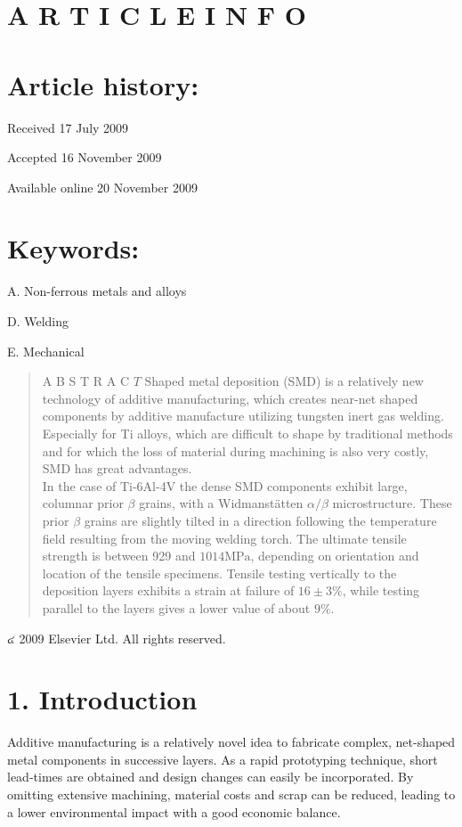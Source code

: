 \documentclass[10pt]{article}
\begin{document}
\section*{A R T I C L E I N F O}
\section*{Article history:}
Received 17 July 2009

Accepted 16 November 2009

Available online 20 November 2009

\section*{Keywords:}
A. Non-ferrous metals and alloys

D. Welding

E. Mechanical

\begin{abstract}
A B S T R A C $T$ Shaped metal deposition (SMD) is a relatively new technology of additive manufacturing, which creates near-net shaped components by additive manufacture utilizing tungsten inert gas welding.\\
Especially for Ti alloys, which are difficult to shape by traditional methods and for which the loss of material during machining is also very costly, SMD has great advantages.\\
In the case of Ti-6Al-4V the dense SMD components exhibit large, columnar prior $\beta$ grains, with a Widmanstätten $\alpha / \beta$ microstructure. These prior $\beta$ grains are slightly tilted in a direction following the temperature field resulting from the moving welding torch. The ultimate tensile strength is between 929 and $1014 \mathrm{MPa}$, depending on orientation and location of the tensile specimens. Tensile testing vertically to the deposition layers exhibits a strain at failure of $16 \pm 3 \%$, while testing parallel to the layers gives a lower value of about $9 \%$.
\end{abstract}

๔ 2009 Elsevier Ltd. All rights reserved.

\section*{1. Introduction}
Additive manufacturing is a relatively novel idea to fabricate complex, net-shaped metal components in successive layers. As a rapid prototyping technique, short lead-times are obtained and design changes can easily be incorporated. By omitting extensive machining, material costs and scrap can be reduced, leading to a lower environmental impact with a good economic balance.
\end{document}
